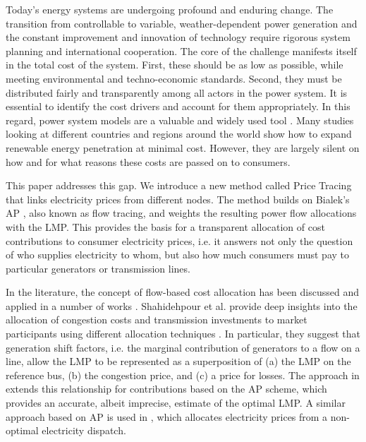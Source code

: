 \documentclass[11pt,twocolumn]{article}
\begin{document}
Today's energy systems are undergoing profound and enduring change. The transition from controllable to variable, weather-dependent power generation and the constant improvement and innovation of technology require rigorous system planning and international cooperation. The core of the challenge manifests itself in the total cost of the system. First, these should be as low as possible, while meeting environmental and techno-economic standards. Second, they must be distributed fairly and transparently among all actors in the power system. It is essential to identify the cost drivers and account for them appropriately.
In this regard, power system models are a valuable and widely used tool \cite{pfenninger_energy_2014,bazmi_sustainable_2011,pereira_generation_2017,brown_sectoral_2019}. Many studies looking at different countries and regions around the world show how to expand renewable energy penetration at minimal cost. However, they are largely silent on how and for what reasons these costs are passed on to consumers.

This paper addresses this gap. We introduce a new method called Price Tracing that links electricity prices from different nodes. The method builds on Bialek's \ac{AP} \cite{bialek_tracing_1996}, also known as flow tracing, and weights the resulting power flow allocations with the \ac{LMP}. This provides the basis for a transparent allocation of cost contributions to consumer electricity prices, i.e. it answers not only the question of who supplies electricity to whom, but also how much consumers must pay to particular generators or transmission lines.

In the literature, the concept of flow-based cost allocation has been discussed and applied in a number of works \cite{galiana_transmission_2003,shahidehpour_market_2002,meng_investigation_2007,schafer_allocation_2017,nikoukar_transmission_2012,arabali_pricing_2012,wu_locational_2005}. Shahidehpour et al. provide deep insights into the allocation of congestion costs and transmission investments to market participants using different allocation techniques \cite{shahidehpour_market_2002}. In particular, they suggest that generation shift factors, i.e. the marginal contribution of generators to a flow on a line, allow the \ac{LMP} to be represented as a superposition of (a) the \ac{LMP} on the reference bus, (b) the congestion price, and (c) a price for losses. The approach in \cite{meng_investigation_2007} extends this relationship for contributions based on the \ac{AP} scheme, which provides an accurate, albeit imprecise, estimate of the optimal \ac{LMP}. A similar approach based on \ac{AP} is used in \cite{tranbergFlowbasedNodalCost2018}, which allocates electricity prices from a non-optimal electricity dispatch.
\end{document}
